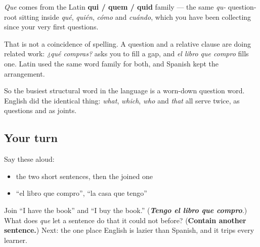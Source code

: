 \begin{cousinweb}
\emph{Que} comes from the Latin \textbf{qui / quem / quid} family — the same \emph{qu-} question-root sitting inside \emph{qué}, \emph{quién}, \emph{cómo} and \emph{cuándo}, which you have been collecting since your very first questions.

That is not a coincidence of spelling. A question and a relative clause are doing related work: \emph{¿qué compras?} asks you to fill a gap, and \emph{el libro que compro} fills one. Latin used the same word family for both, and Spanish kept the arrangement.

So the busiest structural word in the language is a worn-down question word. English did the identical thing: \emph{what}, \emph{which}, \emph{who} and \emph{that} all serve twice, as questions and as joints.
\end{cousinweb}

\subsection*{Your turn}
Say these aloud:

\begin{itemize}
\raggedright
  \item the two short sentences, then the joined one
  \item \textquotedblleft{}el libro que compro\textquotedblright{}, \textquotedblleft{}la casa que tengo\textquotedblright{}
\end{itemize}

\begin{tcolorbox}[breakable,colback=teal!4,colframe=teal!35!black,title={Before you move on}]
Join \textquotedblleft{}I have the book\textquotedblright{} and \textquotedblleft{}I buy the book.\textquotedblright{} (\emph{\textbf{Tengo el libro que compro}}.) What does \emph{que} let a sentence do that it could not before? (\textbf{Contain another sentence.}) Next: the one place English is lazier than Spanish, and it trips every learner.
\end{tcolorbox}

